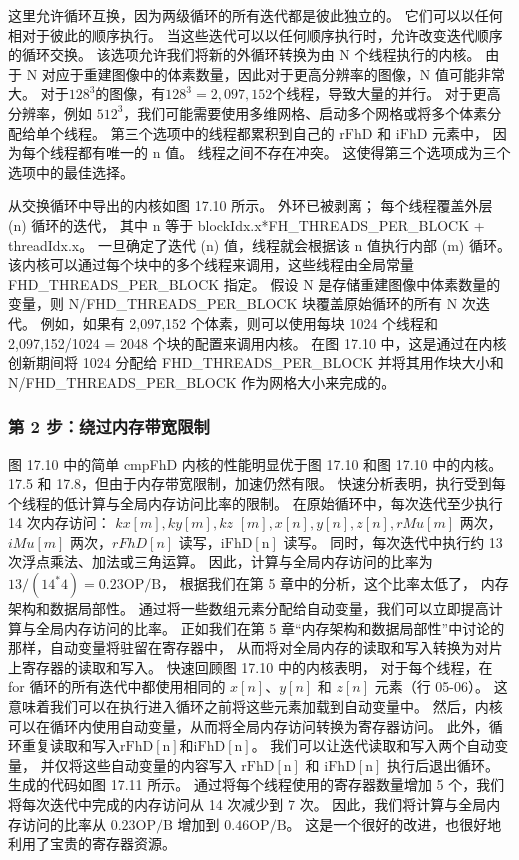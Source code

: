 这里允许循环互换，因为两级循环的所有迭代都是彼此独立的。 它们可以以任何相对于彼此的顺序执行。 
当这些迭代可以以任何顺序执行时，允许改变迭代顺序的循环交换。 该选项允许我们将新的外循环转换为由 N 个线程执行的内核。 
由于 N 对应于重建图像中的体素数量，因此对于更高分辨率的图像，$\mathrm{N}$ 值可能非常大。 
对于$128^{3}$的图像，有$128^{3}=$$2,097,152$个线程，导致大量的并行。 
对于更高分辨率，例如 $512^{3}$，我们可能需要使用多维网格、启动多个网格或将多个体素分配给单个线程。 
第三个选项中的线程都累积到自己的 $\mathrm{rFhD}$ 和 $\mathrm{iFhD}$ 元素中，
因为每个线程都有唯一的 $\mathrm{n}$ 值。 线程之间不存在冲突。 这使得第三个选项成为三个选项中的最佳选择。

从交换循环中导出的内核如图 17.10 所示。 
外环已被剥离； 每个线程覆盖外层 (n) 循环的迭代，
其中 $\mathrm{n}$ 等于 blockIdx.x*FH\_THREADS\_PER\_BLOCK + threadIdx.x。 
一旦确定了迭代 (n) 值，线程就会根据该 $\mathrm{n}$ 值执行内部 (m) 循环。 
该内核可以通过每个块中的多个线程来调用，这些线程由全局常量 FHD\_THREADS\_PER\_BLOCK 指定。 
假设 $\mathrm{N}$ 是存储重建图像中体素数量的变量，则 N/FHD\_THREADS\_PER\_BLOCK 块覆盖原始循环的所有 N 次迭代。 
例如，如果有 2,097,152 个体素，则可以使用每块 1024 个线程和 2,097,152/1024 = 2048 个块的配置来调用内核。 
在图 17.10 中，这是通过在内核创新期间将 1024 分配给 FHD\_THREADS\_PER\_BLOCK 并将其用作块大小和 N/FHD\_THREADS\_PER\_BLOCK 作为网格大小来完成的。

\subsubsection{第 2 步：绕过内存带宽限制}
图 17.10 中的简单 cmpFhD 内核的性能明显优于图 17.10 和图 17.10 中的内核。 
17.5 和 17.8，但由于内存带宽限制，加速仍然有限。 快速分析表明，执行受到每个线程的低计算与全局内存访问比率的限制。 
在原始循环中，每次迭代至少执行 14 次内存访问： $k x[m], k y[m], k z$ $[m], x[n], y[n], z[n], r M u [m]$ 两次，
$i M u[m]$ 两次，$r F h D[n]$ 读写，$\mathrm{iFhD}[\mathrm{n}]$ 读写。 
同时，每次迭代中执行约 13 次浮点乘法、加法或三角运算。 
因此，计算与全局内存访问的比率为 $13 /\left(14^{*} 4\right)=0.23 \mathrm{OP} / \mathrm{B}$，
根据我们在第 5 章中的分析，这个比率太低了， 内存架构和数据局部性。 
通过将一些数组元素分配给自动变量，我们可以立即提高计算与全局内存访问的比率。 
正如我们在第 5 章“内存架构和数据局部性”中讨论的那样，自动变量将驻留在寄存器中，
从而将对全局内存的读取和写入转换为对片上寄存器的读取和写入。 
快速回顾图 17.10 中的内核表明，
对于每个线程，在 for 循环的所有迭代中都使用相同的 $x[n]、y[n]$ 和 $z[n]$ 元素（行 05-06）。 
这意味着我们可以在执行进入循环之前将这些元素加载到自动变量中。 
然后，内核可以在循环内使用自动变量，从而将全局内存访问转换为寄存器访问。 
此外，循环重复读取和写入$\mathrm{rFhD}[\mathrm{n}]$和$\mathrm{iFhD}[\mathrm{n}]$。 
我们可以让迭代读取和写入两个自动变量，
并仅将这些自动变量的内容写入 $\mathrm{rFhD}[\mathrm{n}]$ 和 $\mathrm{iFhD}[\mathrm{n} ]$ 执行后退出循环。 
生成的代码如图 17.11 所示。 通过将每个线程使用的寄存器数量增加 5 个，我们将每次迭代中完成的内存访问从 14 次减少到 7 次。 
因此，我们将计算与全局内存访问的比率从 $0.23 \mathrm{OP} / \mathrm{B}$ 增加到 $0.46 \mathrm{OP} / \mathrm{B}$。 
这是一个很好的改进，也很好地利用了宝贵的寄存器资源。

